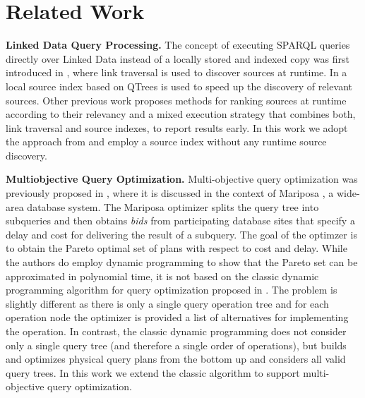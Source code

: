 \section{Related Work}
\label{sec:related}

\textbf{Linked Data Query Processing.} The concept of executing SPARQL
queries directly over Linked Data instead of a locally stored and
indexed copy was first introduced in \cite{hartig_executing_2009},
where link traversal is used to discover sources at runtime. In
\cite{harth_data_2010} a local source index based on QTrees is used to
speed up the discovery of relevant sources. Other previous work
\cite{ladwig_linked_2010,sihjoin_2011} proposes methods for ranking
sources at runtime according to their relevancy and a mixed execution
strategy that combines both, link traversal and source indexes, to
report results early. In this work we adopt the approach from
\cite{harth_data_2010} and employ a source index without any runtime
source discovery. %





\textbf{Multiobjective Query Optimization.} Multi-objective query
optimization was previously proposed in
\cite{papadimitriou_multiobjective_2001}, where it is discussed in the
context of Mariposa \cite{stonebraker_mariposa:_1996}, a wide-area
database system. The Mariposa optimizer splits the query tree into
subqueries and then obtains \emph{bids} from participating database
sites that specify a delay and cost for delivering the result of a
subquery. The goal of the optimzer is to obtain the Pareto optimal set
of plans with respect to cost and delay. While the authors do employ
dynamic programming to show that the Pareto set can be approximated in
polynomial time, it is not based on the classic dynamic programming
algorithm for query optimization proposed in
\cite{selinger_access_1979}. The problem is slightly different as
there is only a single query operation tree and for each operation
node the optimizer is provided a list of alternatives for implementing
the operation. In contrast, the classic dynamic programming
\cite{selinger_access_1979} does not consider only a single query tree
(and therefore a single order of operations), but builds and optimizes
physical query plans from the bottom up and considers all valid query
trees. In this work we extend the classic algorithm to support
multi-objective query optimization.

